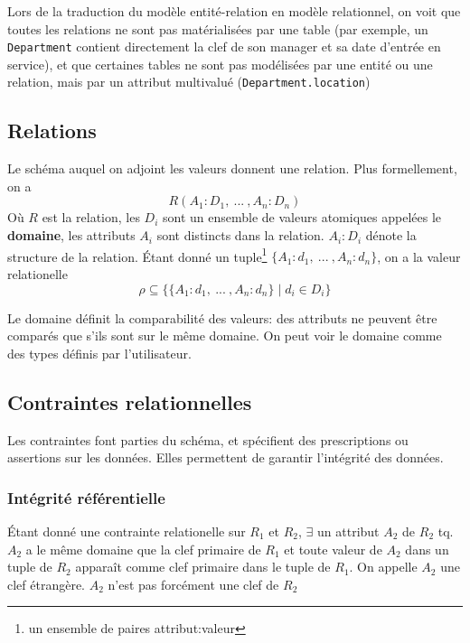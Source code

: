 \documentclass[a4paper]{article}
\begin{document}
Lors de la traduction du modèle entité-relation en modèle relationnel, on voit
que toutes les relations ne sont pas matérialisées par une table (par exemple,
un \texttt{Department} contient directement la clef de son manager et sa date d'entrée en service),
et que certaines tables ne sont pas modélisées par une entité ou une relation, mais
par un attribut multivalué (\texttt{Department.location})

\subsection{Relations}
Le schéma auquel on adjoint les valeurs donnent une relation. Plus formellement, on a
\begin{equation}
  R(A_1:D_1, ~ ... ~ , A_n:D_n)
\end{equation}
Où $R$ est la relation, les $D_i$ sont un ensemble de valeurs atomiques appelées le \textbf{domaine},
les attributs $A_i$ sont distincts dans la relation. $A_i : D_i$ dénote la structure de la relation.
\'Etant donné un tuple\footnote{un ensemble de paires attribut:valeur} $\{A_1: d_1, ~...~, A_n: d_n\}$, on a la valeur relationelle
\begin{equation}
  \rho \subseteq \{\{A_1:d_1, ~...~, A_n:d_n\} \mid d_i \in D_i\}
\end{equation}

Le domaine définit la comparabilité des valeurs: des attributs ne peuvent être comparés
que s'ils sont sur le même domaine. On peut voir le domaine comme des types définis par
l'utilisateur.

\subsection{Contraintes relationnelles}
Les contraintes font parties du schéma, et spécifient des prescriptions ou
assertions sur les données. Elles permettent de garantir l'intégrité des données.

\subsubsection{Intégrité référentielle}
\'Etant donné une contrainte relationelle sur $R_1$ et $R_2$, $\exists$ un attribut
$A_2$ de $R_2$ tq. $A_2$ a le même domaine que la clef primaire de $R_1$ et toute
valeur de $A_2$ dans un tuple de $R_2$ apparaît comme clef primaire dans le tuple
de $R_1$. On appelle $A_2$ une clef étrangère. $A_2$ n'est pas forcément une clef
de $R_2$
\end{document}
